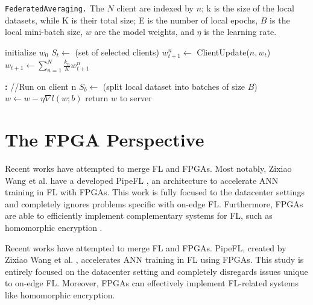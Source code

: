 \begin{algorithm}[H]
    \caption[FederatedAveraging]{\texttt{FederatedAveraging.} The \(N\) client are indexed by \(n\); k is the size of the local datasets, while K is their total size; E is the number of local epochs, \(B\) is the local mini-batch size, \(w\) are the model weights, and \(\eta\) is the learning rate.}
    \label{alg:FederatedAveraging}
    \begin{algorithmic}
            \State initialize $w_0$
                \State $S_{t} \gets$ (set of selected clients)
                    \State $w_{t+1}^n \gets$ ClientUpdate($n,w_t$)
                \EndFor
                \State $w_{t+1} \gets \sum_{n=1}^{N} \frac{k_n}{K} w_{t+1}^n$
            \EndFor
        \EndFunction
        
        \textbf{:} //Run on client n
            \State $S_b \gets $ (split local dataset into batches of size $B$)
                    \State $w \gets w - \eta \nabla l(w;b)$
                \EndFor
            \EndFor
            \State return $w$ to server
        \EndFunction
    \end{algorithmic}
\end{algorithm}


\section{The FPGA Perspective}
Recent works have attempted to merge FL and FPGAs. Most notably, Zixiao Wang et al. have a developed PipeFL \cite{PipeFL}, an architecture to accelerate ANN training in FL with FPGAs. This work is fully focused to the datacenter settings and completely ignores problems specific with on-edge FL. Furthermore, FPGAs are able to efficiently implement complementary systems for FL, such as homomorphic encryption \cite{FPGA_encryption_for_FL}.

Recent works have attempted to merge FL and FPGAs. PipeFL, created by Zixiao Wang et al. \cite{PipeFL}, accelerates ANN training in FL using FPGAs. This study is entirely focused on the datacenter setting and completely disregards issues unique to on-edge FL. Moreover, FPGAs can effectively implement FL-related systems like homomorphic encryption.

